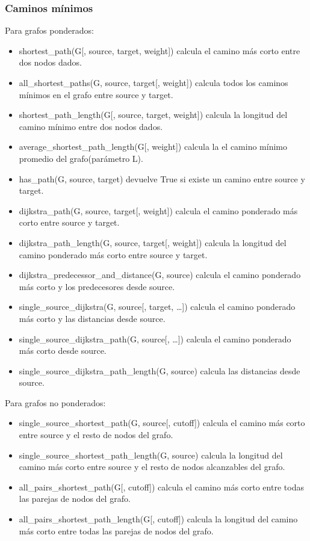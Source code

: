 \subsubsection{Caminos mínimos}
Para grafos ponderados:
\begin{itemize}
\item shortest\_path(G[, source, target, weight]) calcula el camino más corto entre dos nodos dados.
\item all\_shortest\_paths(G, source, target[, weight]) calcula todos los caminos mínimos en el grafo entre source y target.
\item shortest\_path\_length(G[, source, target, weight]) calcula la longitud del camino mínimo entre dos nodos dados.
\item average\_shortest\_path\_length(G[, weight]) calcula la el camino mínimo promedio del grafo(parámetro L).
\item has\_path(G, source, target) devuelve True si existe un camino entre source y target.
\item dijkstra\_path(G, source, target[, weight]) calcula el camino ponderado más corto entre source y target.
\item dijkstra\_path\_length(G, source, target[, weight]) calcula la longitud del camino ponderado más corto entre source y target.
\item dijkstra\_predecessor\_and\_distance(G, source) calcula el camino ponderado más corto y los predecesores desde source.
\item single\_source\_dijkstra(G, source[, target, …]) calcula el camino ponderado más corto y las distancias desde source.
\item single\_source\_dijkstra\_path(G, source[, …]) calcula el camino ponderado más corto desde source.
\item single\_source\_dijkstra\_path\_length(G, source) calcula las distancias desde source.
\end{itemize}

Para grafos no ponderados:
\begin{itemize}
\item single\_source\_shortest\_path(G, source[, cutoff]) calcula el camino más corto entre source y el resto de nodos del grafo.
\item single\_source\_shortest\_path\_length(G, source) calcula la longitud del camino más corto entre source y el resto de nodos alcanzables del grafo.
\item all\_pairs\_shortest\_path(G[, cutoff]) calcula el camino más corto entre todas las parejas de nodos del grafo.
\item all\_pairs\_shortest\_path\_length(G[, cutoff]) calcula la longitud del camino más corto entre todas las parejas de nodos del grafo.
\end{itemize}

